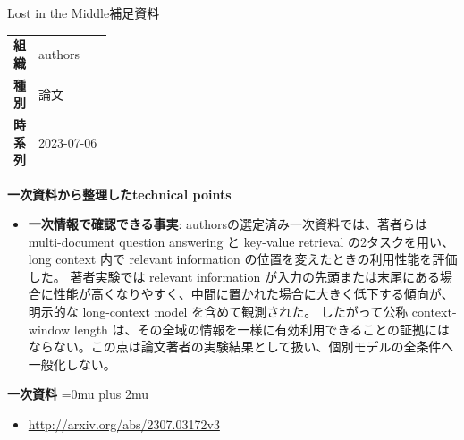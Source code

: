 \begin{technicalnote}{Lost in the Middle}{補足資料}
\begingroup
\begin{tabularx}{\linewidth}{@{}>{\bfseries}p{0.22\linewidth}X@{}}
組織 & authors \\
種別 & 論文 \\
時系列 & 2023-07-06 \\
\end{tabularx}
\smallskip
\Needspace{0.35\textheight}
{\bfseries 一次資料から整理したtechnical points}
\begin{itemize}[leftmargin=1.5em,itemsep=0.35em]
\item \textbf{一次情報で確認できる事実}: authorsの選定済み一次資料では、著者らは multi-document question answering と key-value retrieval の2タスクを用い、long context 内で relevant information の位置を変えたときの利用性能を評価した。 著者実験では relevant information が入力の先頭または末尾にある場合に性能が高くなりやすく、中間に置かれた場合に大きく低下する傾向が、明示的な long-context model を含めて観測された。 したがって公称 context-window length は、その全域の情報を一様に有効利用できることの証拠にはならない。この点は論文著者の実験結果として扱い、個別モデルの全条件へ一般化しない。
\end{itemize}
\begin{minipage}{\linewidth}
\begin{samepage}
{\bfseries 一次資料}
\begingroup\sloppy
\Urlmuskip=0mu plus 2mu\relax
\begin{itemize}[leftmargin=1.5em,itemsep=0.25em]
\item {\scriptsize\url{http://arxiv.org/abs/2307.03172v3}}
\end{itemize}
\endgroup
\end{samepage}
\end{minipage}
\endgroup
\end{technicalnote}
\medskip
